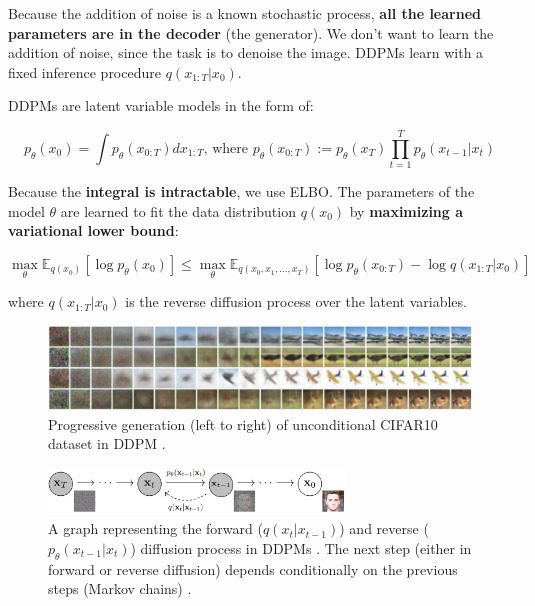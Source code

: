 Because the addition of noise is a known stochastic process, \textbf{all the learned parameters are in the decoder} (the generator). We don't want to learn the addition of noise, since the task is to denoise the image. DDPMs learn with a fixed inference procedure $q(x_{1:T} | x_0)$.

DDPMs are latent variable models in the form of:

\begin{equation*}
    p_\theta (x_0) = \int p_\theta(x_{0:T}) dx_{1:T} \text{,\ \ where \ \ \ } p_\theta (x_{0:T}) := p_\theta (x_T) \prod_{t=1}^{T} p_\theta (x_{t-1} | x_t)
\end{equation*}

Because the \textbf{integral is intractable}, we use ELBO. The parameters of the model $\theta$ are learned to fit the data distribution $q(x_0)$ by \textbf{maximizing a variational lower bound}:

\begin{equation*}
    \max_{\theta} \mathbb{E}_{q(x_0)} [\log p_\theta (x_0)] \leq \max_\theta \mathbb{E}_{q(x_0, x_1, ..., x_T)} [\log p_\theta (x_{0:T}) - \log q(x_{1:T} | x_0)]
\end{equation*}

where $q(x_{1:T} | x_0)$ is the reverse diffusion process over the latent variables.


\begin{figure}
    \centering
    \includegraphics[width=1\textwidth]{images/diffusion_models/ddpm_denoise.png}
    \caption{Progressive generation (left to right) of unconditional CIFAR10 dataset in DDPM \cite{ddpm}.}
\end{figure}


\begin{figure}
    \centering
    \includegraphics[width=0.7\textwidth]{images/diffusion_models/ddpm_process.png}
    \caption{A graph representing the forward ($q(x_t | x_{t-1})$) and reverse ($p_\theta(x_{t-1} | x_t)$) diffusion process in DDPMs \cite{ddpm}. The next step (either in forward or reverse diffusion) depends conditionally on the previous steps (Markov chains) \cite{ddpm}.}
    \label{fig:ddpm_process}
\end{figure}






